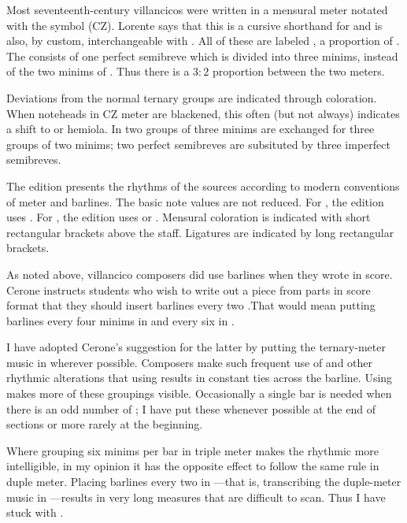 Most seventeenth-century villancicos were written in a mensural meter notated with the symbol \meterCZ{} (CZ).
Lorente says that this is a cursive shorthand for \meterCThreeTwo{} and is also, by custom, interchangeable with \meterCThree.%
  \autocite[165]{Lorente:Porque}
All of these are labeled , a proportion of \meterC{}.
The  consists of one perfect semibreve which is divided into three minims, instead of the two minims of \meterC.
Thus there is a $3:2$ proportion between the two meters.


Deviations from the normal ternary groups are indicated through coloration. 
When noteheads in CZ meter are blackened, this often (but not always) indicates a shift to  or hemiola.
In  two groups of three minims are exchanged for three groups of two minims; two perfect semibreves are subsituted by three imperfect semibreves.

The edition presents the rhythms of the sources according to modern conventions of meter and barlines.
The basic note values are not reduced.
For \meterC, the edition uses .
For \meterCZ, the edition uses  or .
Mensural coloration is indicated with short rectangular brackets above the staff.
Ligatures are indicated by long rectangular brackets.

As noted above, villancico composers did use barlines when they wrote in score.
Cerone instructs students who wish to write out a piece from parts in score format that they should insert barlines every two .\X[cite]
That would mean putting barlines every four minims in \meterC{} and every six in \meterCZ{}.

I have adopted Cerone's suggestion for the latter by putting the ternary-meter music in  wherever possible.
Composers make such frequent use of  and other rhythmic alterations that using  results in constant ties across the barline.
Using  makes more of these groupings visible.
Occasionally a single  bar is needed when there is an odd number of ; I have put these whenever possible at the end of sections or more rarely at the beginning.

Where grouping six minims per bar in triple meter makes the rhythmic more intelligible, in my opinion it has the opposite effect to follow the same rule in duple meter.
Placing barlines every two  in \meterC{}---that is, transcribing the duple-meter music in ---results in very long measures that are difficult to scan.
Thus I have stuck with .

